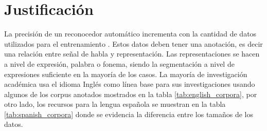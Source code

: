 \section{Justificación}

La precisión de un reconocedor automático incrementa con la cantidad de datos utilizados para el entrenamiento \cite{MooreAListeners}. Estos datos deben tener una anotación, es decir una relación entre señal de habla y representación. Las representaciones se hacen a nivel de expresión, palabra o fonema, siendo la segmentación a nivel de expresiones suficiente en la mayoría de los casos. La mayoría de investigación académica usa el idioma Inglés como línea base para sus investigaciones usando algunos de los corpus anotados mostrados en la tabla \ref{tab:english_corpora}, por otro lado, los recursos para la lengua española se muestran en la tabla \ref{tab:spanish_corpora} donde se evidencia la diferencia entre los tamaños de los datos.





